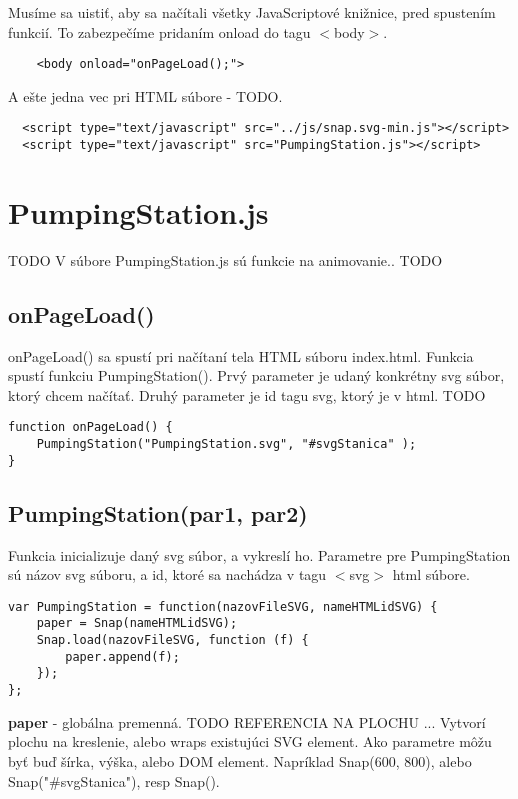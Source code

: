 Musíme sa uistiť, aby sa načítali všetky JavaScriptové knižnice, pred spustením funkcií. To zabezpečíme pridaním  onload do tagu $<$body$>$. 
\begin{lstlisting}
	<body onload="onPageLoad();">
\end{lstlisting}

A ešte jedna vec pri HTML súbore - TODO. 
\begin{lstlisting}
  <script type="text/javascript" src="../js/snap.svg-min.js"></script>
  <script type="text/javascript" src="PumpingStation.js"></script>
\end{lstlisting}


\section{PumpingStation.js}
TODO
V súbore PumpingStation.js sú funkcie na animovanie.. TODO
\subsection{onPageLoad()}
onPageLoad() sa spustí pri načítaní tela HTML súboru index.html. Funkcia spustí funkciu PumpingStation(). Prvý parameter je udaný konkrétny svg súbor, ktorý chcem načítať. Druhý parameter je id tagu svg, ktorý je v html. TODO

\begin{lstlisting}
function onPageLoad() {
	PumpingStation("PumpingStation.svg", "#svgStanica" );
}
\end{lstlisting}

\subsection{PumpingStation(par1, par2)}

Funkcia inicializuje daný svg súbor, a vykreslí ho. 
Parametre pre PumpingStation sú názov svg súboru, a id, ktoré sa nachádza v tagu $<$svg$>$ html súbore.

\begin{lstlisting}
var PumpingStation = function(nazovFileSVG, nameHTMLidSVG) {
	paper = Snap(nameHTMLidSVG);
	Snap.load(nazovFileSVG, function (f) {
		paper.append(f);
	});
};
\end{lstlisting}

\textbf{paper} - globálna premenná. TODO REFERENCIA NA PLOCHU ... Vytvorí plochu na  kreslenie, alebo  wraps existujúci SVG element. Ako parametre môžu byť buď šírka, výška, alebo DOM element. Napríklad Snap(600, 800), alebo Snap("\#svgStanica"), resp Snap(). 


